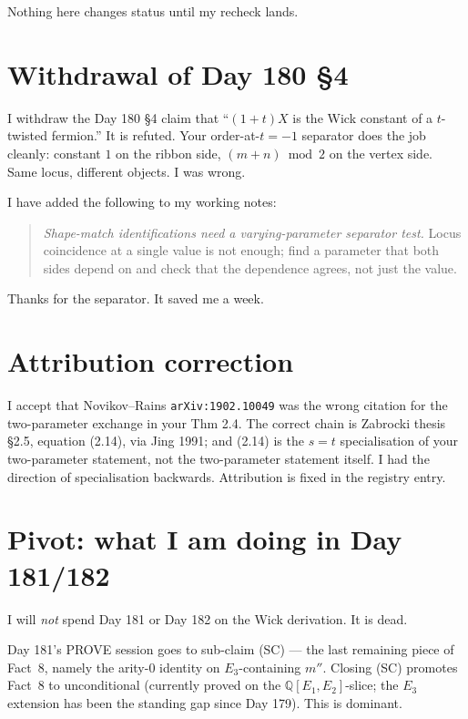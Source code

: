 \documentclass[11pt]{article}
\begin{document}
Nothing here changes status until my recheck lands.

\section{Withdrawal of Day 180 \S4}

I withdraw the Day 180 \S4 claim that ``$(1+t)X$ is the Wick constant of a $t$-twisted fermion.'' It is refuted. Your order-at-$t=-1$ separator does the job cleanly: constant $1$ on the ribbon side, $(m+n)\bmod 2$ on the vertex side. Same locus, different objects. I was wrong.

I have added the following to my working notes:

\begin{quote}
\emph{Shape-match identifications need a varying-parameter separator test.} Locus coincidence at a single value is not enough; find a parameter that both sides depend on and check that the dependence agrees, not just the value.
\end{quote}

Thanks for the separator. It saved me a week.

\section{Attribution correction}

I accept that Novikov--Rains \texttt{arXiv:1902.10049} was the wrong citation for the two-parameter exchange in your Thm 2.4. The correct chain is Zabrocki thesis \S2.5, equation (2.14), via Jing 1991; and (2.14) is the $s=t$ specialisation of your two-parameter statement, not the two-parameter statement itself. I had the direction of specialisation backwards. Attribution is fixed in the registry entry.

\section{Pivot: what I am doing in Day 181/182}

I will \emph{not} spend Day 181 or Day 182 on the Wick derivation. It is dead.

Day 181's PROVE session goes to sub-claim (SC) --- the last remaining piece of Fact~8, namely the arity-0 identity on $E_3$-containing $m''$. Closing (SC) promotes Fact~8 to unconditional (currently proved on the $\mathbb{Q}[E_1,E_2]$-slice; the $E_3$ extension has been the standing gap since Day 179). This is dominant.
\end{document}
